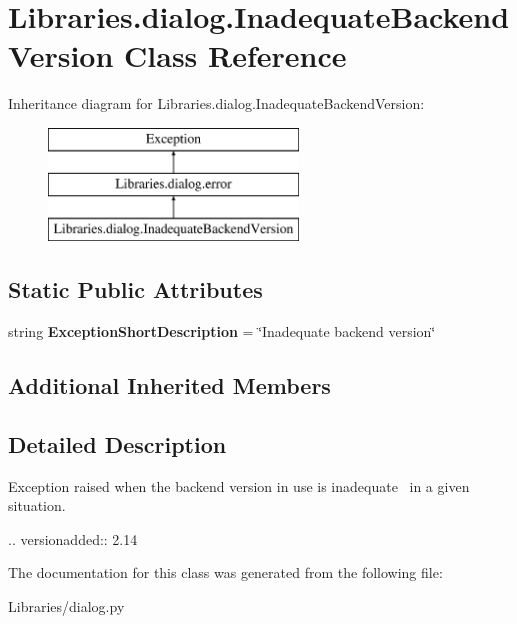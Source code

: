 \hypertarget{class_libraries_1_1dialog_1_1_inadequate_backend_version}{}\section{Libraries.\+dialog.\+Inadequate\+Backend\+Version Class Reference}
\label{class_libraries_1_1dialog_1_1_inadequate_backend_version}
Inheritance diagram for Libraries.\+dialog.\+Inadequate\+Backend\+Version\+:\begin{figure}[H]
\begin{center}
\leavevmode
\includegraphics[height=3.000000cm]{class_libraries_1_1dialog_1_1_inadequate_backend_version}
\end{center}
\end{figure}
\subsection*{Static Public Attributes}
\begin{DoxyCompactItemize}
\item 
string {\bfseries Exception\+Short\+Description} = \char`\"{}Inadequate backend version\char`\"{}\hypertarget{class_libraries_1_1dialog_1_1_inadequate_backend_version_a8f80d6fc7ef2c82864ac1536509a7d1b}{}\label{class_libraries_1_1dialog_1_1_inadequate_backend_version_a8f80d6fc7ef2c82864ac1536509a7d1b}

\end{DoxyCompactItemize}
\subsection*{Additional Inherited Members}


\subsection{Detailed Description}
\begin{DoxyVerb}Exception raised when the backend version in use is inadequate \
in a given situation.

.. versionadded:: 2.14
\end{DoxyVerb}
 

The documentation for this class was generated from the following file\+:\begin{DoxyCompactItemize}
\item 
Libraries/dialog.\+py\end{DoxyCompactItemize}
